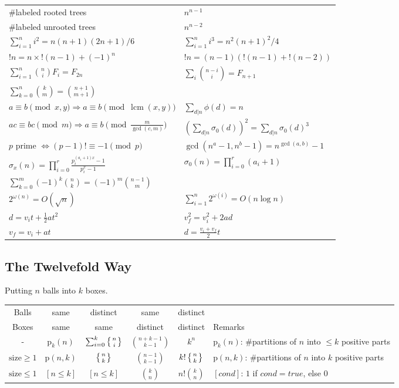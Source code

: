 \documentclass[9pt,a4paper,twocolumn,landscape,oneside]{amsart}
\DeclareMathOperator{\lcm}{lcm}
\begin{document}
    \vspace{10pt}
    \begin{tabular}{ll}
        \#labeled rooted trees & $n^{n-1}$ \\
        \#labeled unrooted trees & $n^{n-2}$ \\
        $\sum_{i=1}^n i^2 = n(n+1)(2n+1)/6$ & $\sum_{i=1}^n i^3 = n^2(n+1)^2/4$ \\
        $!n = n\times!(n-1)+(-1)^n$ & $!n = (n-1)(!(n-1)+!(n-2))$ \\
        $\sum_{i=1}^n \binom{n}{i} F_i = F_{2n}$ & $\sum_{i} \binom{n-i}{i} = F_{n+1}$ \\
        $\sum_{k=0}^n \binom{k}{m} = \binom{n+1}{m+1}$ & \\

        $a\equiv b\pmod{x,y} \Rightarrow a\equiv b\pmod{\lcm(x,y)}$ & $\sum_{d|n} \phi(d) = n$ \\
        $ac\equiv bc\pmod{m} \Rightarrow a\equiv b\pmod{\frac{m}{\gcd(c,m)}}$ & $(\sum_{d|n} \sigma_0(d))^2 = \sum_{d|n} \sigma_0(d)^3$ \\
        $p$ prime $\Leftrightarrow (p-1)!\equiv -1\pmod{p}$ & $\gcd(n^a-1,n^b-1) = n^{\gcd(a,b)}-1$ \\
        $\sigma_x(n) = \prod_{i=0}^{r} \frac{p_i^{(a_i + 1)x} - 1}{p_i^x - 1}$ & $\sigma_0(n) = \prod_{i=0}^r (a_i + 1)$ \\
        $\sum_{k=0}^m (-1)^k \binom{n}{k} = (-1)^m \binom{n-1}{m}$ & \\
        $2^{\omega(n)} = O(\sqrt{n})$ & $\sum_{i=1}^n 2^{\omega(i)} = O(n \log n)$ \\
        $d = v_i t + \frac{1}{2}at^2$ & $v_f^2 = v_i^2 + 2ad$ \\
        $v_f = v_i + at$ & $d = \frac{v_i + v_f}{2}t$ \\
    \end{tabular}
    \subsection{The Twelvefold Way}
        Putting $n$ balls into $k$ boxes.\\
    \begin{tabular}{@{}c|c|c|c|c|l@{}}
    Balls & same & distinct & same & distinct & \\
    Boxes & same & same & distinct & distinct & Remarks\\
    \hline
    - & $\mathrm{p}_k(n)$ & $\sum_{i=0}^k \left\{{n\atop i}\right\}$ & $\binom{n+k-1}{k-1}$ & $k^n$ & $\mathrm{p}_k(n)$: \#partitions of $n$ into $\le k$ positive parts \\
    $\mathrm{size}\ge 1$ & $\mathrm{p}(n,k)$ & $\left\{{n\atop k}\right\}$ & $\binom{n-1}{k-1}$ & $k!\left\{{n\atop k}\right\}$ & $\mathrm{p}(n,k)$: \#partitions of $n$ into $k$ positive parts \\
    $\mathrm{size}\le 1$ & $[n \le k]$ & $[n \le k]$ & $\binom{k}{n}$ & $n!\binom{k}{n}$ & $[cond]$: $1$ if $cond=true$, else $0$\\
    \bottomrule
    \end{tabular}
\end{document}
